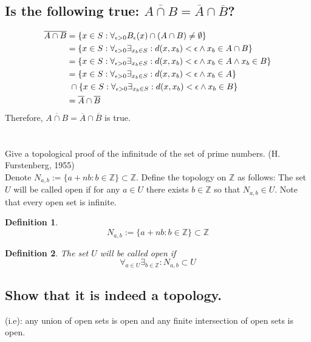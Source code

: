 \documentclass[]{article}
\newcommand{\Z}{\mathbb{Z}}
\newtheorem{definition}{Definition}
\begin{document}
\subsection{Is the following true:
$\overline{A\cap B} = \overline{A} \cap \overline{B}$?}
\begin{align*}
    \overline{A \cap B} &= \qty{x \in S : 
                \forall_{\epsilon> 0} B_\epsilon(x) \cap (A \cap B) 
                \neq \emptyset}\\
    &= \qty{x \in S :  \forall_{\epsilon> 0} \exists_{x_b \in S} : 
        d(x,x_b) < \epsilon \land x_b \in A \cap B}\\
    &= \qty{x \in S : \forall_{\epsilon> 0} \exists_{x_b \in S} : 
        d(x,x_b) < \epsilon \land x_b \in A \land x_b \in B}\\
    &= \qty{x \in S : \forall_{\epsilon> 0} \exists_{x_b \in S} : 
            d(x,x_b) < \epsilon \land x_b \in A}\\
        &\ \cap \qty{x \in S : \forall_{\epsilon> 0} \exists_{x_b \in S} : 
            d(x,x_b) < \epsilon \land x_b \in B}\\
    &= \overline{A} \cap \overline{B}
\end{align*}
Therefore, $\overline{A\cap B} = \overline{A} \cap \overline{B}$ is true.

\newpage
\section{}
Give a topological proof of the infinitude of the set of prime numbers. (H. Furstenberg, 1955)\\
Denote $N_{a,b} := \{a + nb : b \in \Z\} \subset \Z$. Define the topology on $\Z$ as follows: 
The set $U$ will be called open if for any $a \in U$ there exists $b \in \Z$ so that 
$N_{a,b} \in U$. Note that every open set is infinite.

\begin{definition}
    $$N_{a,b} := \{a + nb : b \in \Z\} \subset \Z$$
\end{definition}
\begin{definition}
    The set $U$ will be called open if
    $$\forall_{a\in U} \exists_{b\in\Z} : N_{a,b} \subset U$$
\end{definition}

\subsection{Show that it is indeed a topology.}
(i.e): any union of open sets is open and any finite intersection of open sets is open.
\end{document}
